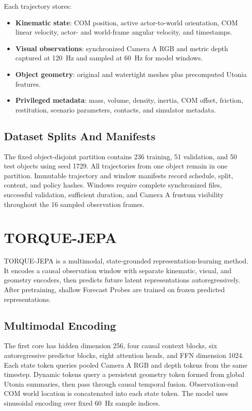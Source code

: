 \documentclass{article}
\begin{document}
Each trajectory stores:
\begin{itemize}
    \item \textbf{Kinematic state}: COM position, active actor-to-world orientation, COM linear velocity, actor- and world-frame angular velocity, and timestamps.
    \item \textbf{Visual observations}: synchronized Camera A RGB and metric depth captured at 120~Hz and sampled at 60~Hz for model windows.
    \item \textbf{Object geometry}: original and watertight meshes plus precomputed Utonia features.
    \item \textbf{Privileged metadata}: mass, volume, density, inertia, COM offset, friction, restitution, scenario parameters, contacts, and simulator metadata.
\end{itemize}

\subsection{Dataset Splits And Manifests}

The fixed object-disjoint partition contains 236 training, 51 validation, and 50 test objects using seed 1729. All trajectories from one object remain in one partition. Immutable trajectory and window manifests record schedule, split, content, and policy hashes. Windows require complete synchronized files, successful validation, sufficient duration, and Camera A frustum visibility throughout the 16 sampled observation frames.

\section{TORQUE-JEPA}

TORQUE-JEPA is a multimodal, state-grounded representation-learning method. It encodes a causal observation window with separate kinematic, visual, and geometry encoders, then predicts future latent representations autoregressively. After pretraining, shallow Forecast Probes are trained on frozen predicted representations.

\subsection{Multimodal Encoding}

The first core has hidden dimension 256, four causal context blocks, six autoregressive predictor blocks, eight attention heads, and FFN dimension 1024. Each state token queries pooled Camera A RGB and depth tokens from the same timestep. Dynamic tokens query a persistent geometry token formed from global Utonia summaries, then pass through causal temporal fusion. Observation-end COM world location is concatenated into each state token. The model uses sinusoidal encoding over fixed 60~Hz sample indices.
\end{document}
